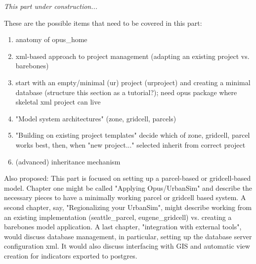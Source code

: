 
\emph{This part under construction...}

These are the possible items that need to be covered in this part:
\begin{enumerate}
    \item anatomy of opus_home
    \item xml-based approach to project management (adapting an existing project vs. barebones)
    \item start with an empty/minimal (ur) project (urproject) and creating a minimal database (structure this section as a tutorial?); need opus package where skeletal xml project can live
    \item "Model system architectures" (zone, gridcell, parcels)
    \item "Building on existing project templates" decide which of zone, gridcell, parcel works best, then, when "new project..." selected inherit from correct project
    \item (advanced) inheritance mechanism
\end{enumerate}

Also proposed: 
This part is focused on setting up a parcel-based or gridcell-based
model. Chapter one might be called "Applying Opus/UrbanSim" and
describe the necessary pieces to have a minimally working parcel or
gridcell based system.  A second chapter, say, "Regionalizing your
UrbanSim", might describe working from an existing implementation
(seattle_parcel, eugene_gridcell) vs. creating a barebones model
application. A last chapter, "integration with external tools", would
discuss database management, in particular, setting up the database
server configuration xml. It would also discuss interfacing with GIS
and automatic view creation for indicators exported to postgres.
